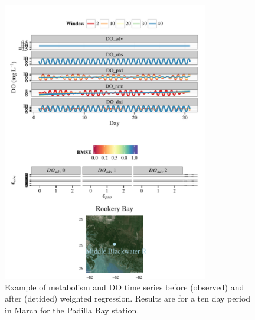 \documentclass[letterpaper,12pt,oneside]{article}\usepackage[]{graphicx}\usepackage[]{color}
\newenvironment{knitrout}{}{} %
\begin{document}
\begin{knitrout}
\begin{figure}[!ht]
{\centering \includegraphics[width=0.8\textwidth]{figure/case_ex3} 

}

\caption[Example of metabolism and \ac{DO} time series before (observed) and after (detided) weighted regression]{Example of metabolism and \ac{DO} time series before (observed) and after (detided) weighted regression. Results are for a ten day period in March for the Padilla Bay station.\label{fig:case_ex3}}
\end{figure}


\end{knitrout}
\vfill
\clearpage

\end{document}
